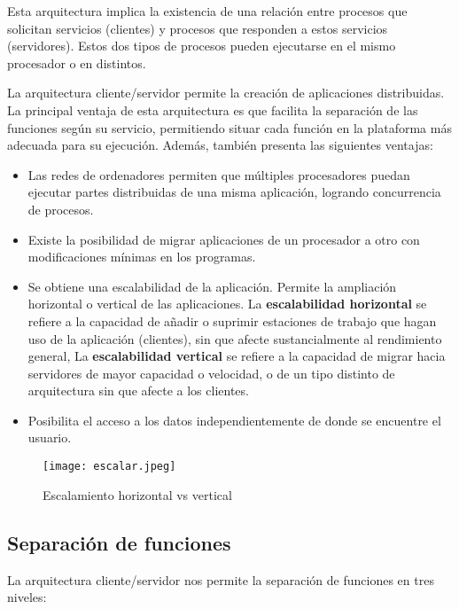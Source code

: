 Esta arquitectura implica la existencia de una relación entre procesos que solicitan
servicios (clientes) y procesos que responden a estos servicios (servidores). Estos
dos tipos de procesos pueden ejecutarse en el mismo procesador o en distintos.

La arquitectura cliente/servidor permite la creación de aplicaciones distribuidas.
La principal ventaja de esta arquitectura es que facilita la separación de las funciones
según su servicio, permitiendo situar cada función en la plataforma más adecuada
para su ejecución. Además, también presenta las siguientes ventajas:

\begin{itemize}
	\item Las redes de ordenadores permiten que múltiples procesadores puedan ejecutar
	partes distribuidas de una misma aplicación, logrando concurrencia de procesos.
	\item Existe la posibilidad de migrar aplicaciones de un procesador a otro con modificaciones mínimas en los programas.
	\item Se obtiene una escalabilidad de la aplicación. Permite la ampliación horizontal
	o vertical de las aplicaciones. La \textbf{escalabilidad horizontal} se refiere a la capacidad de añadir o suprimir estaciones de trabajo que hagan uso de la aplicación
	(clientes), sin que afecte sustancialmente al rendimiento general, La \textbf{escalabilidad vertical} se refiere a la capacidad de migrar hacia servidores
	de mayor capacidad o velocidad, o de un tipo distinto de arquitectura sin que
	afecte a los clientes.
	\item Posibilita el acceso a los datos independientemente de donde se encuentre el
usuario.
\end{itemize}	

\begin{figure}[H]
	\center
	\texttt{[image: escalar.jpeg]}
	\caption{Escalamiento horizontal vs vertical}
	\label{fig:super}
\end{figure}

\subsection{Separación de funciones}

La arquitectura cliente/servidor nos permite la separación de funciones en tres
niveles:


